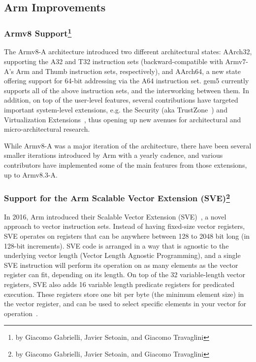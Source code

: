 \subsection[Arm Improvements]{Arm Improvements}

\subsubsection[Armv8 Support]{Armv8 Support\footnote{by Giacomo Gabrielli, Javier Setoain, and Giacomo Travaglini}}

The Armv8-A architecture introduced two different architectural states:
AArch32, supporting the A32 and T32 instruction sets (backward-compatible with
Armv7-A's Arm and Thumb instruction sets, respectively), and AArch64, a new
state offering support for 64-bit addressing via the A64 instruction set. gem5
currently supports all of the above instruction sets, and the interworking
between them. In addition, on top of the user-level features, several
contributions have targeted important system-level extensions, e.g. the
Security (aka TrustZone~\cite{ArmTustZone}) and Virtualization Extensions~\cite{ArmARM}, thus opening up new
avenues for architectural and micro-architectural research.

While Armv8-A was a major iteration of the architecture, there have been
several smaller iterations introduced by Arm with a yearly cadence, and various
contributors have implemented some of the main features from those extensions,
up to Armv8.3-A.

\subsubsection[Support for the Arm Scalable Vector Extension (SVE)]{Support for the Arm Scalable Vector Extension (SVE)\footnote{by Giacomo Gabrielli, Javier Setoain, and Giacomo Travaglini}}

In 2016, Arm introduced their Scalable Vector Extension (SVE)~\cite{ArmARM}, a
novel approach to vector instruction sets. Instead of having fixed-size vector
registers, SVE operates on registers that can be anywhere between 128 to 2048
bit long (in 128-bit increments). SVE code is arranged in a way that is agnostic to the
underlying vector length (Vector Length Agnostic Programming), and a single SVE
instruction will perform its operation on as many elements as the vector
register can fit, depending on its length. On top of the 32 variable-length
vector registers, SVE also adds 16 variable length predicate registers for
predicated execution. These registers store one bit per byte (the minimum
element size) in the vector register, and can be used to select specific
elements in your vector for operation~\cite{white-paper-on-SVE-and-VLA-programming}.



